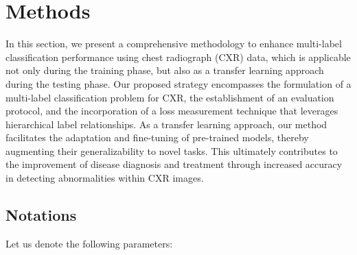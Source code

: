\section{Methods}\label{sec:methods}
In this section, we present a comprehensive methodology to enhance multi-label classification performance using chest radiograph (CXR) data, which is applicable not only during the training phase, but also as a transfer learning approach during the testing phase. Our proposed strategy encompasses the formulation of a multi-label classification problem for CXR, the establishment of an evaluation protocol, and the incorporation of a loss measurement technique that leverages hierarchical label relationships. As a transfer learning approach, our method facilitates the adaptation and fine-tuning of pre-trained models, thereby augmenting their generalizability to novel tasks. This ultimately contributes to the improvement of disease diagnosis and treatment through increased accuracy in detecting abnormalities within CXR images.



\subsection{Notations}\label{subsec:notations}

Let us denote the following parameters:

